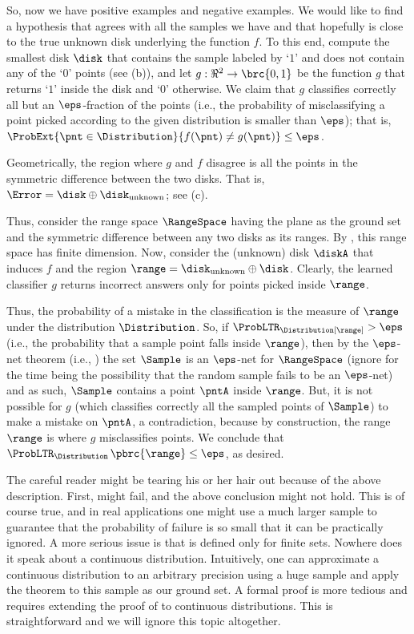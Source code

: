So, now we have positive examples and negative examples. We would like
to find a hypothesis that agrees with all the samples we have and that
hopefully is close to the true unknown disk underlying the function
$f$. To this end, compute the smallest disk $\disk$ that contains the
sample labeled by `$1$' and does not contain any of the `$0$' points
(see  (b)),
and let $g:\Re^2 \rightarrow \brc{0,1}$ be the function $g$ that
returns `$1$' inside the disk and `$0$' otherwise.  We claim that $g$
classifies correctly all but an $\eps$-fraction of the points (i.e.,
the probability of misclassifying a point picked according to the
given distribution is smaller than $\eps$); that is, $\ProbExt{\pnt
   \in \Distribution}{f(\pnt) \ne g(\pnt)} \leq \eps$.

Geometrically, the region where $g$ and $f$ disagree is all the points
in the symmetric difference between the two disks. That is, $\Error =
\disk \oplus \disk_{\text{unknown}}$; see  (c).

Thus, consider the range space $\RangeSpace$ having the plane as the
ground set and the symmetric difference between any two disks as its
ranges. By , this range space has finite \VC{}
dimension. Now, consider the (unknown) disk $\diskA$ that induces $f$
and the region $\range = \disk_\text{unknown} \oplus \disk$. Clearly,
the learned classifier $g$ returns incorrect answers only for points
picked inside $\range$.

Thus, the probability of a mistake in the classification is the
measure of $\range$ under the distribution $\Distribution$. So, if
$\ProbLTR_\Distribution [ \range ] > \eps$ (i.e., the probability that
a sample point falls inside $\range$), then by the $\eps$-net theorem
(i.e., ) the set $\Sample$ is an $\eps$-net for
$\RangeSpace$ (ignore for the time being the possibility that the
random sample  fails to be an $\eps$-net) and as
such, $\Sample$ contains a point $\pntA$ inside $\range$. But, it is
not possible for $g$ (which classifies correctly all the sampled
points of $\Sample$) to make a mistake on $\pntA$, a contradiction,
because by construction, the range $\range$ is where $g$ misclassifies
points. We conclude that
$\ProbLTR_\Distribution\, \pbrc{ \range } \leq \eps$, as desired.

  The careful reader might be tearing his or
her hair out because of the above description. First,
 might fail, and the above conclusion might not
hold. This is of course true, and in real applications one might use a
much larger sample to guarantee that the probability of failure is so
small that it can be practically ignored.  A more serious issue is
that  is defined only for finite sets. Nowhere
does it speak about a continuous distribution.  Intuitively, one can
approximate a continuous distribution to an arbitrary precision using
a huge sample and apply the theorem to this sample as our ground
set. A formal proof is more tedious and requires extending the proof
of  to continuous distributions. This is
straightforward and we will ignore this topic altogether.


